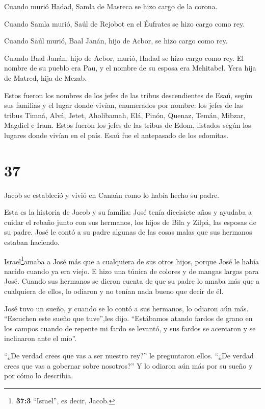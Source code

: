  Cuando murió Hadad, Samla de Masreca se hizo cargo de la
corona.

 Cuando Samla murió, Saúl de Rejobot en el Éufrates se hizo
cargo como rey.

 Cuando Saúl murió, Baal Janán, hijo de Acbor, se hizo
cargo como rey.

 Cuando Baal Janán, hijo de Acbor, murió, Hadad se hizo
cargo como rey. El nombre de su pueblo era Pau, y el nombre de su esposa
era Mehitabel. Yera hija de Matred, hija de Mezab.

 Estos fueron los nombres de los jefes de las tribus
descendientes de Esaú, según sus familias y el lugar donde vivían,
enumerados por nombre: los jefes de las tribus Timná, Alvá, Jetet,
 Aholibamah, Elá, Pinón,  Quenaz, Temán,
Mibzar,  Magdiel e Iram. Estos fueron los jefes de las
tribus de Edom, listados según los lugares donde vivían en el país. Esaú
fue el antepasado de los edomitas.

\hypertarget{section-36}{%
\section{37}\label{section-36}}

 Jacob se estableció y vivió en Canaán como lo había hecho
su padre.

 Esta es la historia de Jacob y su familia: José tenía
diecisiete años y ayudaba a cuidar el rebaño junto con sus hermanos, los
hijos de Bila y Zilpá, las esposas de su padre. José le contó a su padre
algunas de las cosas malas que sus hermanos estaban haciendo.

 Israel\footnote{\textbf{37:3} ``Israel'', es decir, Jacob.}amaba
a José más que a cualquiera de sus otros hijos, porque José le había
nacido cuando ya era viejo. E hizo una túnica de colores y de mangas
largas para José.  Cuando sus hermanos se dieron cuenta de
que su padre lo amaba más que a cualquiera de ellos, lo odiaron y no
tenían nada bueno que decir de él.

 José tuvo un sueño, y cuando se lo contó a sus hermanos, lo
odiaron aún más.  ``Escuchen este sueño que tuve'',les dijo.
 ``Estábamos atando fardos de grano en los campos cuando de
repente mi fardo se levantó, y sus fardos se acercaron y se inclinaron
ante el mío''.

 ``¿De verdad crees que vas a ser nuestro rey?'' le
preguntaron ellos. ``¿De verdad crees que vas a gobernar sobre
nosotros?'' Y lo odiaron aún más por su sueño y por cómo lo describía.

